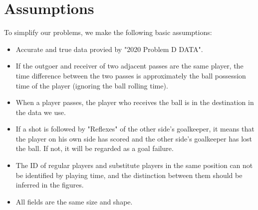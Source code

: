 \documentclass{mcmthesis}
\begin{document}
\section{Assumptions}
To simplify our problems, we make the following basic assumptions:
\begin{itemize}
\item Accurate and true data provied by "2020 Problem D DATA".
\item If the outgoer and receiver of two adjacent passes are the same player, the time difference between the two passes is approximately the ball possession time of the player (ignoring the ball rolling time).
\item When a player passes, the player who receives the ball is in the destination in the data we use.
\item If a shot is followed by "Reflexes" of the other side's goalkeeper, it means that the player on his own side has scored and the other side's goalkeeper has lost the ball. If not, it will be regarded as a goal failure.
\item The ID of regular players and substitute players in the same position can not be identified by playing time, and the distinction between them should be inferred in the figures.
\item All fields are the same size and shape.
\end{itemize}
\end{document}
